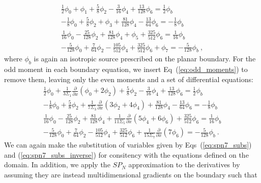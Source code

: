 \documentclass[letterpaper,12pt]{article}
\begin{document}
\begin{subequations}
  \begin{gather}
    \frac{1}{2}\phi_0 + \phi_1 + \frac{5}{8}\phi_2 -
    \frac{3}{16}\phi_4 + \frac{13}{128}\phi_6 =
    \frac{1}{2}\phi_{b}\\ -\frac{1}{8}\phi_0 + \frac{5}{8}\phi_2 +
    \phi_3 + \frac{81}{128}\phi_4 - \frac{13}{64}\phi_6 =
    -\frac{1}{8}\phi_{b}\\ \frac{1}{16}\phi_0 - \frac{25}{128}\phi_2 +
    \frac{81}{128}\phi_4 + \phi_5 + \frac{325}{512}\phi_6 =
    \frac{1}{16}\phi_{b}\\ -\frac{5}{128}\phi_0 + \frac{7}{64}\phi_2 -
    \frac{105}{512}\phi_4 + \frac{325}{512}\phi_6 + \phi_7 =
    -\frac{5}{128}\phi_{b}\:,
  \end{gather}
  \label{eq:spn_bnd_integrated}
\end{subequations}
where $\phi_b$ is again an isotropic source prescribed on the planar
boundary. For the odd moment in each boundary equation, we insert
Eq~(\ref{eq:odd_moments}) to remove them, leaving only the even
moments and a set of differential equations:
\begin{subequations}
  \begin{gather}
    \frac{1}{2}\phi_0 + \frac{1}{3\Sigma_1}\frac{\partial}{\partial
      x}(\phi_0+2\phi_2) + \frac{5}{8}\phi_2 - \frac{3}{16}\phi_4 +
    \frac{13}{128}\phi_6 = \frac{1}{2}\phi_{b}\\ -\frac{1}{8}\phi_0 +
    \frac{5}{8}\phi_2 + \frac{1}{7\Sigma_3}\frac{\partial}{\partial
      x}(3\phi_2 + 4\phi_4) + \frac{81}{128}\phi_4 -
    \frac{13}{64}\phi_6 = -\frac{1}{8}\phi_{b}\\ \frac{1}{16}\phi_0 -
    \frac{25}{128}\phi_2 + \frac{81}{128}\phi_4 +
    \frac{1}{11\Sigma_5}\frac{\partial}{\partial x}(5\phi_4 + 6\phi_6)
    + \frac{325}{512}\phi_6 =
    \frac{1}{16}\phi_{b}\\ -\frac{5}{128}\phi_0 + \frac{7}{64}\phi_2 -
    \frac{105}{512}\phi_4 + \frac{325}{512}\phi_6 +
    \frac{1}{15\Sigma_7}\frac{\partial}{\partial x}(7\phi_6)
    = -\frac{5}{128}\phi_{b}\:.
  \end{gather}
  \label{eq:spn_bnd_subs}
\end{subequations}
We can again make the substitution of variables given by
Eqs~(\ref{eq:spn7_subs}) and (\ref{eq:spn7_subs_inverse}) for
consitency with the equations defined on the domain. In addition, we
apply the $SP_N$ approximation to the derivatives by assuming they are
instead multidimensional gradients on the boundary such that
\end{document}
